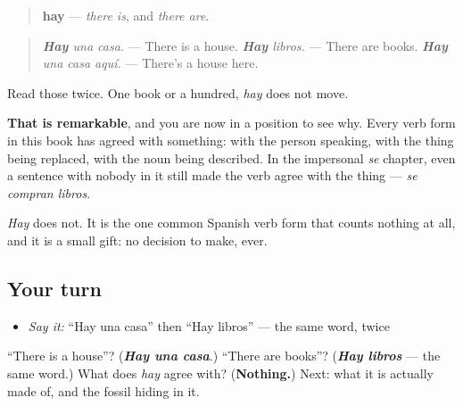 \begin{grammarlens}[title={Grammar Lens: one form, and it does not count}]
\begin{quote}
\textbf{hay} — \emph{there is}, and \emph{there are}.
\end{quote}

\begin{quote}
\emph{\textbf{Hay} una casa.} — There is a house. \emph{\textbf{Hay} libros.} — There are books. \emph{\textbf{Hay} una casa aquí.} — There's a house here.
\end{quote}

Read those twice. One book or a hundred, \emph{hay} does not move.

\textbf{That is remarkable}, and you are now in a position to see why. Every verb form in this book has agreed with something: with the person speaking, with the thing being replaced, with the noun being described. In the impersonal \emph{se} chapter, even a sentence with nobody in it still made the verb agree with the thing — \emph{se compran libros}.

\emph{Hay} does not. It is the one common Spanish verb form that counts nothing at all, and it is a small gift: no decision to make, ever.
\end{grammarlens}

\subsection*{Your turn}
\begin{itemize}
\raggedright
  \item \emph{Say it:} \textquotedblleft{}Hay una casa\textquotedblright{} then \textquotedblleft{}Hay libros\textquotedblright{} — the same word, twice
\end{itemize}

\begin{tcolorbox}[breakable,colback=teal!4,colframe=teal!35!black,title={Before you move on}]
\textquotedblleft{}There is a house\textquotedblright{}? (\emph{\textbf{Hay una casa}}.) \textquotedblleft{}There are books\textquotedblright{}? (\emph{\textbf{Hay libros}} — the same word.) What does \emph{hay} agree with? (\textbf{Nothing.}) Next: what it is actually made of, and the fossil hiding in it.
\end{tcolorbox}

